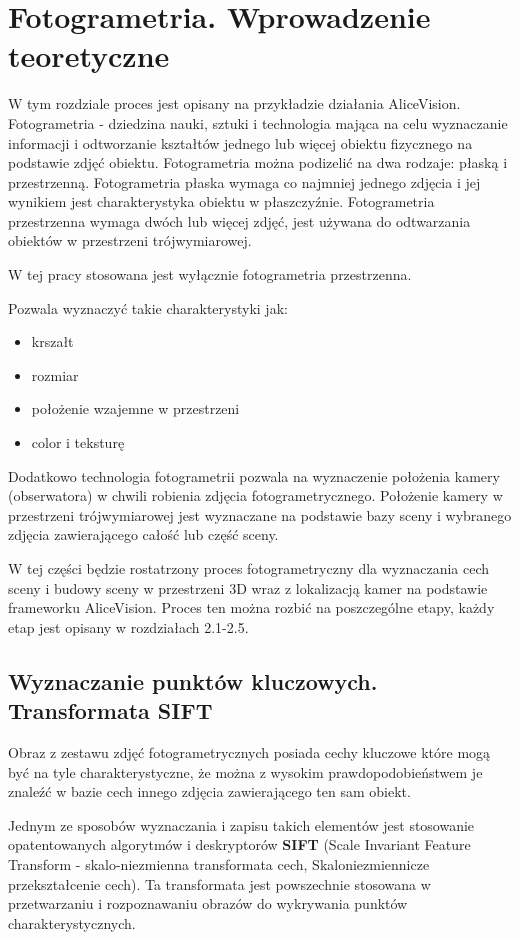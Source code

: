 \graphicspath{ {./img/2_Theory/} }


\chapter{Fotogrametria. Wprowadzenie teoretyczne}
W tym rozdziale proces jest opisany na przykładzie działania AliceVision.
Fotogrametria - dziedzina nauki, sztuki i technologia mająca na celu wyznaczanie informacji i odtworzanie kształtów jednego lub więcej obiektu fizycznego na podstawie zdjęć obiektu.
Fotogrametria można podizelić na dwa rodzaje: płaską i przestrzenną. Fotogrametria płaska wymaga co najmniej jednego zdjęcia i jej wynikiem jest charakterystyka obiektu w płaszczyźnie. Fotogrametria przestrzenna wymaga dwóch lub więcej zdjęć, jest używana do odtwarzania obiektów w przestrzeni trójwymiarowej.

W tej pracy stosowana jest wyłącznie fotogrametria przestrzenna.

Pozwala wyznaczyć takie charakterystyki jak:
\begin{itemize}
   \item krszałt
   \item rozmiar
   \item położenie wzajemne w przestrzeni
   \item color i teksturę
\end{itemize}

Dodatkowo technologia fotogrametrii pozwala na wyznaczenie położenia kamery (obserwatora) w chwili robienia zdjęcia fotogrametrycznego.
Położenie kamery w przestrzeni trójwymiarowej jest wyznaczane na podstawie bazy sceny i wybranego zdjęcia zawierającego całość lub część sceny.

W tej części będzie rostatrzony proces fotogrametryczny dla wyznaczania cech sceny i budowy sceny w przestrzeni 3D wraz z lokalizacją kamer na podstawie frameworku AliceVision. Proces ten można rozbić na poszczególne etapy, każdy etap jest opisany w rozdziałach 2.1-2.5.

\section{Wyznaczanie punktów kluczowych. Transformata SIFT}
Obraz z zestawu zdjęć fotogrametrycznych posiada cechy kluczowe które mogą być na tyle charakterystyczne, że można z wysokim prawdopodobieństwem je znaleźć w bazie cech innego zdjęcia zawierającego ten sam obiekt.

Jednym ze sposobów wyznaczania i zapisu takich elementów jest stosowanie opatentowanych algorytmów i deskryptorów \textbf{SIFT} (Scale Invariant Feature Transform - skalo-niezmienna transformata cech, Skaloniezmiennicze przekształcenie cech). Ta transformata jest powszechnie stosowana w przetwarzaniu i rozpoznawaniu obrazów do wykrywania punktów charakterystycznych.


